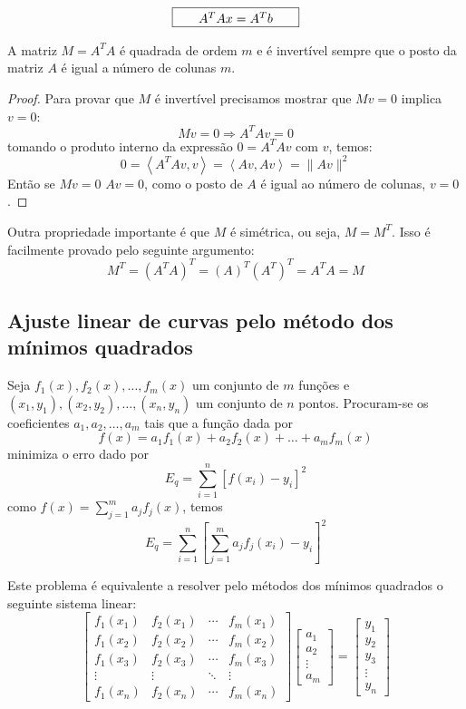 \documentclass[main.tex]{subfiles}
\begin{document}
\begin{equation}\framebox[100 pt][c]{$A^TA x = A^Tb$}\end{equation}

\begin{teo}
A matriz $M=A^TA$ é quadrada de ordem $m$ e é invertível sempre que o posto da matriz $A$ é igual a número de colunas $m$.
\end{teo}
\begin{proof}
Para provar que $M$ é invertível precisamos mostrar que $Mv=0$ implica $v=0$:
$$Mv=0\Longrightarrow A^TAv=0$$
tomando o produto interno da expressão $0=A^TAv$ com $v$, temos:
$$0=\left<A^TAv,v\right>=\left<Av,Av\right>=\|Av\|^2$$
Então se $Mv=0$ $Av=0$, como o posto de $A$ é igual ao número de colunas, $v=0$.
\end{proof}
Outra propriedade importante é que $M$ é simétrica, ou seja, $M=M^T$. Isso é facilmente provado pelo seguinte argumento:
$$M^T=(A^TA)^T=(A)^T(A^T)^T=A^TA=M$$


\subsection{Ajuste linear de curvas pelo método dos mínimos quadrados}
Seja $f_1(x), f_2(x),\ldots, f_m(x)$ um conjunto de $m$ funções e $(x_1,y_1), (x_2,y_2), \ldots, (x_n,y_n)$ um conjunto de $n$ pontos. Procuram-se os coeficientes $a_1,a_2,\ldots, a_m$ tais que a função dada por
$$f(x)=a_1f_1(x)+a_2f_2(x)+\ldots+a_mf_m(x)$$
minimiza o erro dado por
$$E_q= \sum_{i=1}^n \left[f(x_i)-y_i\right]^2$$
como $f(x)=\sum_{j=1}^m a_jf_j(x)$, temos
$$E_q= \sum_{i=1}^n \left[\sum_{j=1}^m a_jf_j(x_i)-y_i\right]^2$$

Este problema é equivalente a resolver pelo métodos dos mínimos quadrados o seguinte sistema linear:
$$
\left[
\begin{array}{cccc}
f_1(x_1)&f_2(x_1) & \cdots & f_m(x_1)\\
f_1(x_2)&f_2(x_2) & \cdots & f_m(x_2)\\
f_1(x_3)&f_2(x_3) & \cdots & f_m(x_3)\\
\vdots & \vdots & \ddots & \vdots\\
f_1(x_n)&f_2(x_n) & \cdots & f_m(x_n)
\end{array}
\right]
\left[
\begin{array}{c}
a_1\\
a_2\\
\vdots\\
a_m
\end{array}
\right]=\left[\begin{array}{c}
y_1\\
y_2\\
y_3\\
\vdots\\
y_n
\end{array}
\right]
$$
\end{document}
